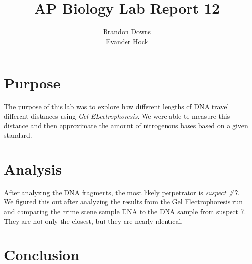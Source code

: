 \documentclass[12pt]{article}
\title{AP Biology Lab Report 12}
\author{Brandon Downs \\ Evander Hock}
\begin{document}
\maketitle

\section{Purpose}

The purpose of this lab was to explore how different lengths of DNA travel different distances using \textit{Gel ELectrophoresis}.
We were able to measure this distance and then approximate the amount of nitrogenous bases based on a given standard.

\section{Analysis}

After analyzing the DNA fragments, the most likely perpetrator is \textit{suspect \#7}. We figured this out after analyzing the results from the Gel Electrophoresis run and comparing the crime scene sample DNA to the DNA sample from suspect 7. They are not only the closest, but they are nearly identical.

\section{Conclusion}
\end{document}
